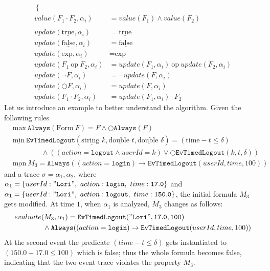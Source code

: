 \documentclass[english]{article}
\begin{document}
{\begin{align*}
\begin{cases}
        \end{cases}\\
        value(F_1 \cdot F_2,\alpha_i) & = value(F_1)\land value(F_2) \\ \\
        update(\underline{\text{true}},\alpha_i) & = \underline{\text{true}} \\
        update(\underline{\text{false}},\alpha_i) & = \underline{\text{false}} \\ 
        update(\text{exp},\alpha_i) & = \text{exp}\\
        update(F_1\ \text{op}\ F_2,\alpha_i) & = update(F_1,\alpha_i)\ \text{op}\ update(F_2,\alpha_i) \\
        update(\neg{F},\alpha_i) & = \neg{update(F,\alpha_i)}  \\
        update(\bigcirc F,\alpha_i) & = update(F,\alpha_i)  \\
        update(F_1 \cdot F_2,\alpha_i) & = update(F_1,\alpha_i)\cdot F_2
    \end{align*}
    }
Let us introduce an example to better understand the algorithm. Given the following rules 
\begin{align*}
    &\underline{\text{max}}\ \mathtt{Always}(\underline{\text{Form}}\ F)  = F \land \bigcirc \mathtt{Always}(F) \\
    &\underline{\text{min}}\ \mathtt{EvTimedLogout}(\underline{\text{string }} k, \underline{\text{double }} t, \underline{\text{double }} \delta) = (\text{time} - t \leq \delta) \\
    &\quad\quad\quad\quad \land ((action = \mathtt{logout} \land userId = k) \lor \bigcirc \mathtt{EvTimedLogout}(k, t, \delta)) \\
    &\underline{\text{mon}}\ M_3  = \mathtt{Always}((action = \mathtt{login}) \rightarrow \mathtt{EvTimedLogout}(userId,time, 100))
\end{align*}
and a trace $\sigma=\alpha_1,\alpha_2$, where $\alpha_1=\{userId:\mathtt{"Lori"},\ action:\mathtt{login},\ time:\mathtt{17.0}\}$ and $\alpha_1=\{userId:\mathtt{"Lori"},\ action:\mathtt{logout},\ time:\mathtt{150.0}\}$, the initial formula $M_3$ gets modified. At time $1$, when $\alpha_1$ is analyzed, $M_3$ changes as follows:
\begin{align*}
    &evaluate(M_3,\alpha_1)  = \mathtt{EvTimedLogout("Lori",17.0, 100)} \\ 
    &\quad\quad\quad\quad \land\mathtt{Always}((action = \mathtt{login}) \rightarrow \mathtt{EvTimedLogout}(userId,time, 100))
\end{align*}
At the second event the predicate $(time-t \leq \delta)$ gets instantiated to $(150.0-17.0 \leq 100)$ which is false; thus the whole formula becomes false, indicating that the two-event trace violates the property $M_3$. 
\end{document}
